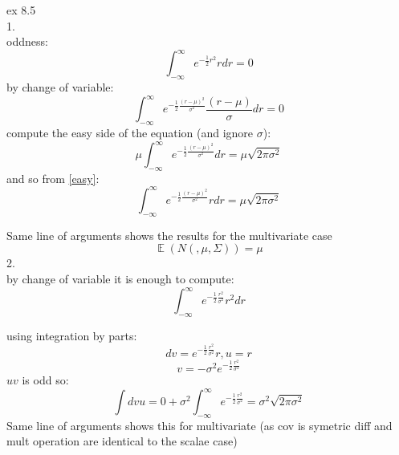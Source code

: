 \documentclass[20pt]{extarticle}
\DeclareMathOperator{\E}{\mathbb{E}}
\begin{document}
ex 8.5\\ 
1.\\
oddness:\\
\begin{equation}
\int_{-\infty}^{\infty}e^{-\frac{1}{2}r^2}rdr = 0
\end{equation}
by change of variable:\\
\begin{equation}
\int_{-\infty}^{\infty}e^{-\frac{1}{2}\frac{(r-\mu)^2}{\sigma^2}}\frac{(r-\mu)}{\sigma}dr = 0
\end{equation} 
compute the easy side of the equation (and ignore $\sigma$):\\
\begin{equation}\label{easy}
\mu\int_{-\infty}^{\infty}e^{-\frac{1}{2}\frac{(r-\mu)^2}{\sigma^2}}dr = \mu\sqrt{2\pi\sigma^2}
\end{equation}
and so from \ref{easy}:\\
\begin{equation}
\int_{-\infty}^{\infty}e^{-\frac{1}{2}\frac{(r-\mu)^2}{\sigma^2}}rdr = \mu\sqrt{2\pi\sigma^2}
\end{equation} 


Same line of arguments shows the results for the multivariate case
$$\E(N(,\mu,\Sigma)) = \mu$$
2. \\
by change of variable it is enough to compute:\\
$$\int_{-\infty}^{\infty}e^{-\frac{1}{2}\frac{r^2}{\sigma^2}}r^2dr $$

using integration by parts: \\
$$dv = e^{-\frac{1}{2}\frac{r^2}{\sigma^2}}r , u = r$$
$$ v = -\sigma^2 e^{-\frac{1}{2}\frac{r^2}{\sigma^2}}$$
$uv$ is odd so:\\

$$\int dvu= 0 + \sigma^2 \int_{-\infty}^{\infty}e^{-\frac{1}{2}\frac{r^2}{\sigma^2}} = \sigma^2 \sqrt{2\pi\sigma^2}$$
Same line of arguments shows this for multivariate (as cov is symetric diff and mult operation are identical to the scalae case)
\end{document}
